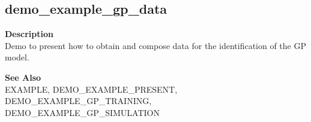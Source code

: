 \subsection*{demo\_example\_gp\_data} \label{fun:demo_example_gp_data}

\textbf{Description}
\\ Demo to present how to obtain and compose data for the identification
 of the GP model.

\textbf{See Also}
\\ EXAMPLE, DEMO\_EXAMPLE\_PRESENT, DEMO\_EXAMPLE\_GP\_TRAINING,
\\ DEMO\_EXAMPLE\_GP\_SIMULATION
